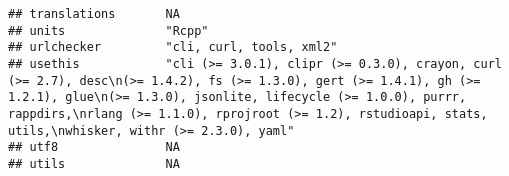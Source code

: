 \documentclass[
]{article}
\begin{document}
\begin{verbatim}
## translations       NA                                                                                                                                                                                                                                                                                                                                                                                                                                           
## units              "Rcpp"                                                                                                                                                                                                                                                                                                                                                                                                                                       
## urlchecker         "cli, curl, tools, xml2"                                                                                                                                                                                                                                                                                                                                                                                                                     
## usethis            "cli (>= 3.0.1), clipr (>= 0.3.0), crayon, curl (>= 2.7), desc\n(>= 1.4.2), fs (>= 1.3.0), gert (>= 1.4.1), gh (>= 1.2.1), glue\n(>= 1.3.0), jsonlite, lifecycle (>= 1.0.0), purrr, rappdirs,\nrlang (>= 1.1.0), rprojroot (>= 1.2), rstudioapi, stats, utils,\nwhisker, withr (>= 2.3.0), yaml"                                                                                                                                             
## utf8               NA                                                                                                                                                                                                                                                                                                                                                                                                                                           
## utils              NA                                                                                                                                                                                                                                                                                                                                                                                                                                           

\end{verbatim}
\end{document}
